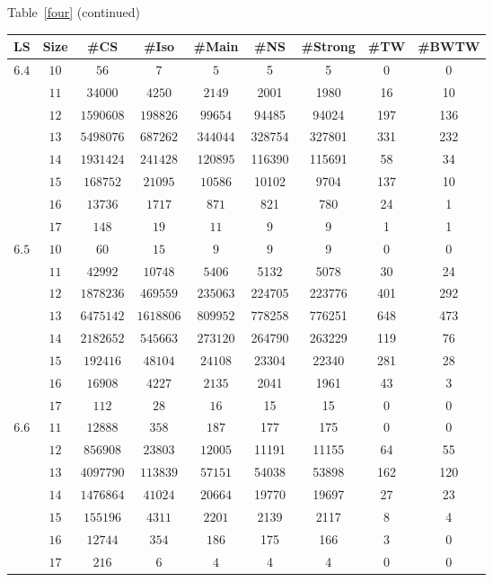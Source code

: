 \documentclass[12pt]{report}
\begin{document}
\newpage
\begin{center}
Table~\ref{four} (continued)
\begin{tabular}{|c|c|c|c|c|c|c|c|c|} \hline
 LS & Size & \#CS & \#Iso & \#Main& \#NS & \#Strong & \#TW & \#BWTW \\ \hline
$6.4$ & $10$  & $56$ & $7$  & $5$ & 5 & 5 & 0 & 0 \\
      & $11$  & $34000$ & $4250$  & $2149$ & 2001 & 1980 & 16 & 10 \\
      & $12$  & $1590608$ & $198826$  & $99654$ & 94485 & 94024 & 197 & 136 \\
      & $13$  & $5498076$ & $687262$  & $344044$ & 328754 & 327801 & 331 & 232 \\
      & $14$  & $1931424$ & $241428$  & $120895$ & 116390 & 115691 & 58 & 34 \\
      & $15$  & $168752$ & $21095$  & $10586$ & 10102 & 9704 & 137 & 10 \\
      & $16$  & $13736$ & $1717$  & $871$ & 821 & 780 & 24 & 1 \\
      & $17$  & $148$  & $19$   & $11$ & 9 & 9 & 1 & 1 \\ \hline
$6.5$ & $10$  & $60$ & $15$  & $9$ & 9 & 9 & 0 & 0 \\
      & $11$  & $42992$ & $10748$  & $5406$ & 5132 & 5078 & 30 & 24 \\
      & $12$  & $1878236$ & $469559$  & $235063$ & 224705 & 223776 & 401 & 292 \\
      & $13$  & $6475142$ & $1618806$  & $809952$ & 778258 & 776251 & 648 & 473 \\
      & $14$  & $2182652$ & $545663$  & $273120$ & 264790 & 263229 & 119 & 76 \\
      & $15$  & $192416$ & $48104$  & $24108$ & 23304 & 22340 & 281 & 28 \\
      & $16$  & $16908$ & $4227$  & $2135$ & 2041 & 1961 & 43 & 3 \\
      & $17$  & $112$  & $28$   & $16$ & 15 & 15 & 0 & 0 \\ \hline
$6.6$ & $11$  & $12888$ & $358$  & $187$ & 177 & 175 & 0 & 0 \\
      & $12$  & $856908$ & $23803$  & $12005$ & 11191 & 11155 & 64 & 55 \\
      & $13$  & $4097790$ & $113839$  & $57151$ & 54038 & 53898 & 162 & 120 \\
      & $14$  & $1476864$ & $41024$  & $20664$ & 19770 & 19697 & 27 & 23 \\
      & $15$  & $155196$ & $4311$  & $2201$ & 2139 & 2117 & 8 & 4 \\
      & $16$  & $12744$ & $354$  & $186$ & 175 & 166 & 3 & 0 \\
      & $17$  & $216$  & $6$   & $4$ & 4 & 4 & 0 & 0 \\ \hline
\end{tabular} \vspace{3mm} \\
\end{center}
\end{document}
